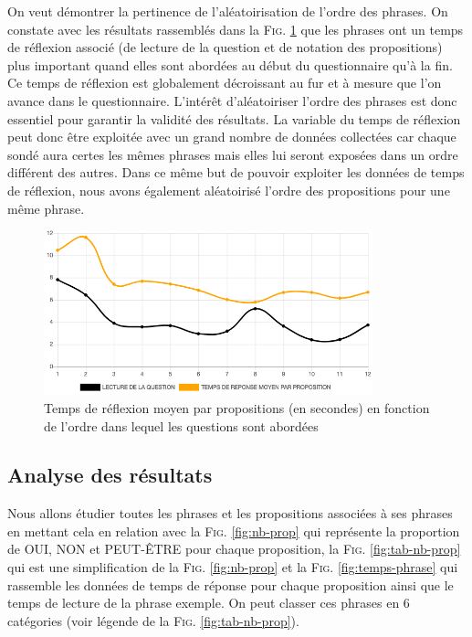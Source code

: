 \documentclass[11pt,letterpaper]{article}
\begin{document}
On veut démontrer la pertinence de l'aléatoirisation de l'ordre des phrases. On constate avec les résultats rassemblés dans la \textsc{Fig. }\ref{fig:temps-ordre} que les phrases ont un temps de réflexion associé (de lecture de la question et de notation des propositions) plus important quand elles sont abordées au début du questionnaire qu'à la fin. Ce temps de réflexion est globalement décroissant au fur et à mesure que l'on avance dans le questionnaire. L'intérêt d'aléatoiriser l'ordre des phrases est donc essentiel pour garantir la validité des résultats. La variable du temps de réflexion peut donc être exploitée avec un grand nombre de données collectées car chaque sondé aura certes les mêmes phrases mais elles lui seront exposées dans un ordre différent des autres. Dans ce même but de pouvoir exploiter les données de temps de réflexion, nous avons également aléatoirisé l'ordre des propositions pour une même phrase.

\vspace{6px}

\begin{figure}[htbp]
\begin{center}
\includegraphics[width=0.85\textwidth]{figures/temps-ordre.png}
\caption{Temps de réflexion moyen par propositions (en secondes) en fonction de l'ordre dans lequel les questions sont abordées}
\label{fig:temps-ordre}
\end{center}
\end{figure}


\subsection{Analyse des résultats}

Nous allons étudier toutes les phrases et les propositions associées à ses phrases en mettant cela en relation avec la \textsc{Fig. }\ref{fig:nb-prop} qui représente la proportion de OUI, NON et PEUT-ÊTRE pour chaque proposition, la \textsc{Fig. }\ref{fig:tab-nb-prop} qui est une simplification de la \textsc{Fig. }\ref{fig:nb-prop} et la \textsc{Fig. }\ref{fig:temps-phrase} qui rassemble les données de temps de réponse pour chaque proposition ainsi que le temps de lecture de la phrase exemple. On peut classer ces phrases en 6 catégories (voir légende de la \textsc{Fig. }\ref{fig:tab-nb-prop}).
\end{document}
